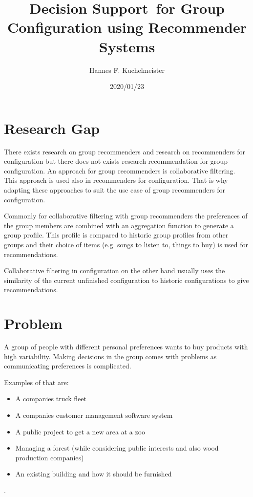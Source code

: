 \documentclass{article}
\begin{document}
\title{Decision Support for Group Configuration using Recommender Systems}
\author{Hannes F. Kuchelmeister}
\date{2020/01/23}

\maketitle

\section{Research Gap}

There exists research on group recommenders and research on recommenders for configuration but there does not exists research recommendation for group configuration. An approach for group recommenders is collaborative filtering. This approach is used also in recommenders for configuration. That is why adapting these approaches to suit the use case of group recommenders for configuration.

Commonly for collaborative filtering with group recommenders the preferences of the group members are combined with an aggregation function to generate a group profile. This profile is compared to historic group profiles from other groups and their choice of items (e.g. songs to listen to, things to buy) is used for recommendations.

Collaborative filtering in configuration on the other hand usually uses the similarity of the current unfinished configuration to historic configurations to give recommendations.

\section{Problem}
A group of people with different personal preferences wants to buy products with high variability. Making decisions in the group comes with problems as communicating preferences is complicated.

Examples of that are:
\begin{itemize}
    \item A companies truck fleet
    \item A companies customer management software system
    \item A public project to get a new area at a zoo
    \item Managing a forest (while considering public interests and also wood production companies)
    \item An existing building and how it should be furnished
\end{itemize}. 
\end{document}
